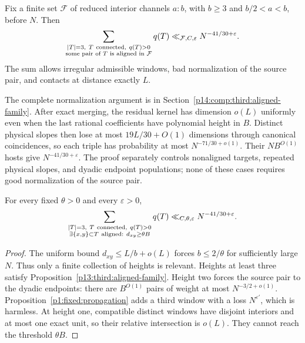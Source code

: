\begin{proposition}
\label{p13:third:aligned-family}
Fix a finite set $\mathcal F$ of reduced interior channels $a:b$, with
$b\geq3$ and $b/2<a<b$, before $N$.  Then
\begin{equation}
 \sum_{\substack{|T|=3,\ T\ {\rm connected},\ q(T)>0\\
            \text{some pair of }T\text{ is aligned in }\mathcal F}}q(T)
       \ll_{\mathcal F,C,\varepsilon}N^{-41/30+\varepsilon}.
 \label{p13:third:aligned-family-bound}
\end{equation}
The sum allows irregular admissible windows, bad normalization of the
source pair, and contacts at distance exactly $L$.
\end{proposition}

The complete normalization argument is in
Section~\ref{p14:comp:third:aligned-family}.  After exact merging, the
residual kernel has dimension $o(L)$ uniformly even when the last
rational coefficients have polynomial height in $B$.  Distinct
physical slopes then lose at most $19L/30+O(1)$ dimensions through
canonical coincidences, so each triple has probability at most
$N^{-71/30+o(1)}$.  Their $NB^{O(1)}$ hosts give
$N^{-41/30+\varepsilon}$.  The proof separately controls nonaligned
targets, repeated physical slopes, and dyadic endpoint populations;
none of these cases requires good normalization of the source pair.

\begin{corollary}
\label{p13:third:aligned}
For every fixed $\theta>0$ and every $\varepsilon>0$,
\begin{equation}
 \sum_{\substack{|T|=3,\ T\ {\rm connected},\ q(T)>0\\
        \exists\{x,y\}\subset T\ {\rm aligned}:\ d_{xy}\geq\theta B}}
             q(T)\ll_{C,\theta,\varepsilon}N^{-41/30+\varepsilon}.
 \label{p13:third:strong-aligned-bound}
\end{equation}
\end{corollary}

\begin{proof}
The uniform bound $d_{xy}\leq L/b+o(L)$ forces $b\leq2/\theta$
for sufficiently large $N$.  Thus only a finite collection of heights
is relevant.  Heights at least three satisfy
Proposition~\ref{p13:third:aligned-family}.
Height two forces the source pair to the dyadic endpoints: there are
$B^{O(1)}$ pairs of weight at most $N^{-3/2+o(1)}$.
Proposition~\ref{p1:fixed:propagation} adds a third window with a loss
$N^{\varepsilon'}$, which is harmless.
At height one, compatible distinct windows have disjoint interiors
and at most one exact unit, so their relative intersection is $o(L)$.
They cannot reach the threshold $\theta B$.
\end{proof}

